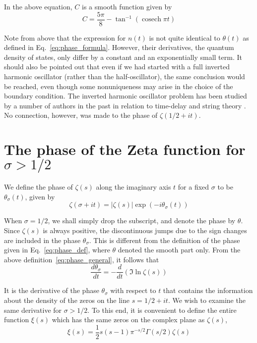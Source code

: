 \documentclass[11pt]{article}
\theoremstyle{plain}
\begin{document}
In the above equation, $C$ is a smooth function given by
\begin{equation}
C = \frac{5\pi}{8} - \tan^{-1}(\operatorname{cosech} \pi t)
\label{eq:smooth_function}
\end{equation}

Note from above that the expression for $n(t)$ is not quite identical to $\theta(t)$ as defined in Eq.~\eqref{eq:phase_formula}. However, their derivatives, the quantum density of states, only differ by a constant and an exponentially small term. It should also be pointed out that even if we had started with a full inverted harmonic oscillator (rather than the half-oscillator), the same conclusion would be reached, even though some nonuniqueness may arise in the choice of the boundary condition. The inverted harmonic oscillator problem has been studied by a number of authors in the past in relation to time-delay \cite{ford1959,barton1986} and string theory \cite{brezin1990,gross1990,parisi1990,ginsparg1990}. No connection, however, was made to the phase of $\zeta(1/2+ it)$.

\section{The phase of the Zeta function for $\sigma > 1/2$}

We define the phase of $\zeta(s)$ along the imaginary axis $t$ for a fixed $\sigma$ to be $\theta_\sigma(t)$, given by
\begin{equation}
\zeta(\sigma + it) = |\zeta(s)|\exp(-i\theta_\sigma(t))
\label{eq:phase_general}
\end{equation}

When $\sigma = 1/2$, we shall simply drop the subscript, and denote the phase by $\theta$. Since $\zeta(s)$ is always positive, the discontinuous jumps due to the sign changes are included in the phase $\theta_\sigma$. This is different from the definition of the phase given in Eq.~\eqref{eq:phase_def}, where $\theta$ denoted the smooth part only. From the above definition~\eqref{eq:phase_general}, it follows that
\begin{equation}
\frac{d\theta_\sigma}{dt} = -\frac{d}{dt}(\Im \ln \zeta(s))
\label{eq:phase_derivative}
\end{equation}

It is the derivative of the phase $\theta_\sigma$ with respect to $t$ that contains the information about the density of the zeros on the line $s = 1/2 + it$. We wish to examine the same derivative for $\sigma > 1/2$. To this end, it is convenient to define \cite{edwards1974} the entire function $\xi(s)$ which has the same zeros on the complex plane as $\zeta(s)$,
\begin{equation}
\xi(s) = \frac{1}{2} s(s-1) \pi^{-s/2} \Gamma(s/2) \zeta(s)
\label{eq:xi_function}
\end{equation}
\end{document}
